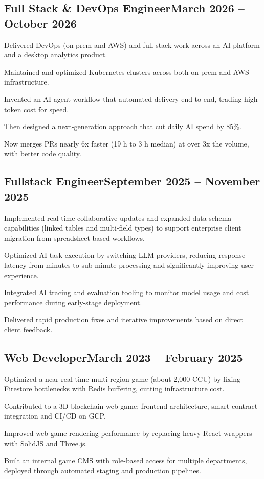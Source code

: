 \subsection{{Full Stack \& DevOps Engineer\hfill March 2026 -- October 2026}}
\begin{zitemize}
\item Delivered DevOps (on-prem and AWS) and full-stack work across an AI platform and a desktop analytics product.
\item Maintained and optimized Kubernetes clusters across both on-prem and AWS infrastructure.
\item Invented an AI-agent workflow that automated delivery end to end, trading high token cost for speed.
\item Then designed a next-generation approach that cut daily AI spend by 85\%.
\item Now merges PRs nearly 6x faster (19 h to 3 h median) at over 3x the volume, with better code quality.
\end{zitemize}

\subsection{{Fullstack Engineer\hfill September 2025 -- November 2025}}
\begin{zitemize}
\item Implemented real-time collaborative updates and expanded data schema capabilities (linked tables and multi-field types) to support enterprise client migration from spreadsheet-based workflows.
\item Optimized AI task execution by switching LLM providers, reducing response latency from minutes to sub-minute processing and significantly improving user experience.
\item Integrated AI tracing and evaluation tooling to monitor model usage and cost performance during early-stage deployment.
\item Delivered rapid production fixes and iterative improvements based on direct client feedback.
\end{zitemize}

\subsection{{Web Developer\hfill March 2023 -- February 2025}}
\begin{zitemize}
\item Optimized a near real-time multi-region game (about 2,000 CCU) by fixing Firestore bottlenecks with Redis buffering, cutting infrastructure cost.
\item Contributed to a 3D blockchain web game: frontend architecture, smart contract integration and CI/CD on GCP.
\item Improved web game rendering performance by replacing heavy React wrappers with SolidJS and Three.js.
\item Built an internal game CMS with role-based access for multiple departments, deployed through automated staging and production pipelines.
\end{zitemize}

